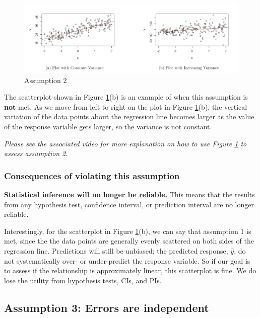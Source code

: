 \documentclass[
]{book}
\begin{document}
\begin{figure}
\centering
\includegraphics{images/ass2.jpg}
\caption{\label{fig:ass2}Assumption 2}
\end{figure}

The scatterplot shown in Figure \ref{fig:ass2}(b) is an example of when this assumption is \textbf{not} met. As we move from left to right on the plot in Figure \ref{fig:ass2}(b), the vertical variation of the data points about the regression line becomes larger as the value of the response variable gets larger, so the variance is not constant.

\emph{Please see the associated video for more explanation on how to use Figure \ref{fig:ass2} to assess assumption 2.}

\hypertarget{consequences-of-violating-this-assumption-1}{%
\subsubsection{Consequences of violating this assumption}\label{consequences-of-violating-this-assumption-1}}

\textbf{Statistical inference will no longer be reliable.} This means that the results from any hypothesis test, confidence interval, or prediction interval are no longer reliable.

Interestingly, for the scatterplot in Figure \ref{fig:ass2}(b), we can say that assumption 1 is met, since the the data points are generally evenly scattered on both sides of the regression line. Predictions will still be unbiased; the predicted response, \(\hat{y}\), do not systematically over- or under-predict the response variable. So if our goal is to assess if the relationship is approximately linear, this scatterplot is fine. We do lose the utility from hypothesis tests, CIs, and PIs.

\hypertarget{assumption-3-errors-are-independent}{%
\subsection{Assumption 3: Errors are independent}\label{assumption-3-errors-are-independent}}
\end{document}
